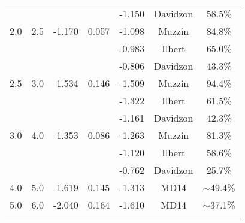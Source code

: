 \begin{table}
\begin{center}
\begin{tabular}{ c c c c c c c }
            \multicolumn{4}{c}{}              &  -1.150 &     Davidzon &         58.5\% \\ 
            2.0 &     2.5 &  -1.170 &   0.057 &  -1.098 &       Muzzin &         84.8\% \\ 
            \multicolumn{4}{c}{}              &  -0.983 &       Ilbert &         65.0\% \\ 
            \multicolumn{4}{c}{}              &  -0.806 &     Davidzon &         43.3\% \\ 
            2.5 &     3.0 &  -1.534 &   0.146 &  -1.509 &       Muzzin &         94.4\% \\ 
            \multicolumn{4}{c}{}              &  -1.322 &       Ilbert &         61.5\% \\ 
            \multicolumn{4}{c}{}              &  -1.161 &     Davidzon &         42.3\% \\ 
            3.0 &     4.0 &  -1.353 &   0.086 &  -1.263 &       Muzzin &         81.3\% \\ 
            \multicolumn{4}{c}{}              &  -1.120 &       Ilbert &         58.6\% \\ 
            \multicolumn{4}{c}{}              &  -0.762 &     Davidzon &         25.7\% \\ 
            4.0 &     5.0 &  -1.619 &   0.145 &  -1.313 &         MD14 &    $\sim$49.4\% \\ 
            5.0 &     6.0 &  -2.040 &   0.164 &  -1.610 &         MD14 &    $\sim$37.1\% \\ 
        
        \hline
        
        \vspace{-0.5ex}

\end{tabular}

\begin{minipage}{0.42\textwidth}


\end{minipage}
\end{center}
\end{table}
